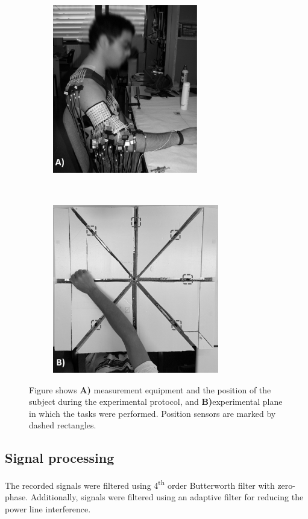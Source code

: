 \begin{figure}[t!]
    \centering
    \begin{subfigure}[t]{0.45\textwidth}
        \centering
        \includegraphics[height=2.9in]{Images/figure4_1a.png}
   
    \end{subfigure}%
    ~ 
    \begin{subfigure}[t]{0.45\textwidth}
        \centering
        \includegraphics[height=2.9in]{Images/figure4_1b.png}
        
    \end{subfigure}
    \caption{Figure shows \textbf{A)} measurement equipment and the position of the subject during the experimental protocol, and \textbf{B)}experimental plane in which the tasks were performed. Position sensors are marked by dashed rectangles.}
\label{fig:4-1}
\end{figure}


\subsection{Signal processing}
The recorded signals were filtered using 4\textsuperscript{th} order Butterworth filter with zero-phase. Additionally, signals were filtered using an adaptive filter for reducing the power line interference.

